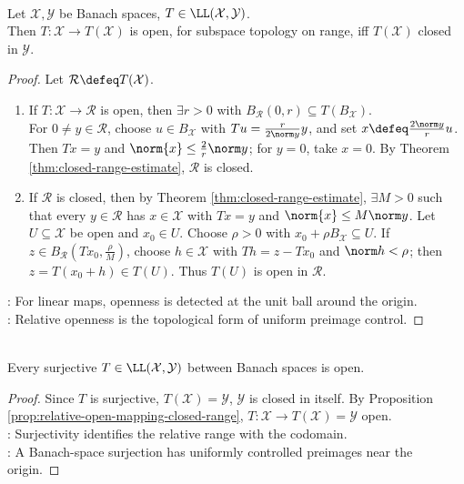\begin{proposition} \label{prop:relative-open-mapping-closed-range} \\
Let $\mathcal{X},\mathcal{Y}$ be Banach spaces, $T\in\LL(\mathcal{X},\mathcal{Y})$.\\
Then $T:\mathcal{X}\to T(\mathcal{X})$ is open, for subspace topology on range, iff $T(\mathcal{X})$ closed in $\mathcal{Y}$.
\begin{proof}
Let $\mathcal R\defeq T(\mathcal X)$.
\begin{enumerate}[label=\roman*.]
\setlength{\itemsep}{0pt}
\item[$(\Rightarrow)$] If $T:\mathcal X\to\mathcal R$ is open, then $\exists r>0$ with $B_{\mathcal R}(0,r)\subseteq T(B_{\mathcal X})$.\\
For $0\neq y\in\mathcal R$, choose $u\in B_{\mathcal X}$ with $Tu=\frac{r}{2\norm y}y$, and set $x\defeq\frac{2\norm y}{r}u$.\\
Then $Tx=y$ and $\norm{x}\leq\frac{2}{r}\norm y$; for $y=0$, take $x=0$. By Theorem \ref{thm:closed-range-estimate}, $\mathcal R$ is closed.
\item[$(\Leftarrow)$] If $\mathcal R$ is closed, then by Theorem \ref{thm:closed-range-estimate}, $\exists M>0$ such that every $y\in\mathcal R$ has $x\in\mathcal X$ with $Tx=y$ and $\norm{x}\leq M\norm y$. Let $U\subseteq\mathcal X$ be open and $x_0\in U$. Choose $\rho>0$ with $x_0+\rho B_{\mathcal X}\subseteq U$. If $z\in B_{\mathcal R}(Tx_0,\frac{\rho}{M})$, choose $h\in\mathcal X$ with $Th=z-Tx_0$ and $\norm h<\rho$; then $z=T(x_0+h)\in T(U)$. Thus $T(U)$ is open in $\mathcal R$.
\end{enumerate}
: For linear maps, openness is detected at the unit ball around the origin.\\
: Relative openness is the topological form of uniform preimage control.
\end{proof}
\end{proposition}

\begin{theorem} \label{thm:open-mapping-theorem} \\
Every surjective $T\in\LL(\mathcal{X},\mathcal{Y})$ between Banach spaces is open.
\begin{proof}
Since $T$ is surjective, $T(\mathcal X)=\mathcal Y$, $\mathcal Y$ is closed in itself. By Proposition \ref{prop:relative-open-mapping-closed-range}, $T:\mathcal X\to T(\mathcal X)=\mathcal Y$ open.\\
: Surjectivity identifies the relative range with the codomain.\\
: A Banach-space surjection has uniformly controlled preimages near the origin.
\end{proof}
\end{theorem}

